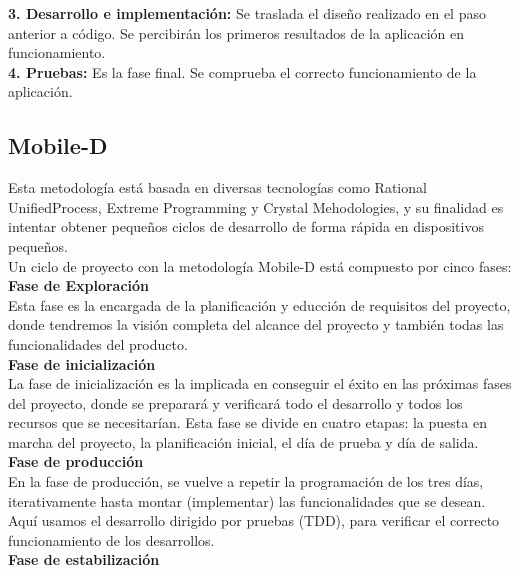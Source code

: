 \textbf{3. Desarrollo e implementación:} Se traslada el diseño realizado en el paso anterior a código. Se percibirán los primeros resultados de la aplicación en funcionamiento.\\

\textbf{4. Pruebas:} Es la fase final. Se comprueba el correcto funcionamiento de la aplicación. \\

\subsection{Mobile-D}

Esta metodología está basada en diversas tecnologías como Rational UnifiedProcess, Extreme Programming y Crystal Mehodologies, y su finalidad es intentar obtener pequeños ciclos de desarrollo de forma rápida en dispositivos pequeños. \\

Un ciclo de proyecto con la metodología Mobile-D está compuesto por cinco fases:\\

\textbf{Fase de Exploración}\\

Esta fase es la encargada de la planificación y educción de requisitos del proyecto, donde tendremos la visión completa del alcance del proyecto y también todas las funcionalidades del producto.  \\

\textbf{Fase de inicialización}\\

La fase de inicialización es la implicada en conseguir el éxito en las próximas fases del proyecto, donde se preparará y verificará todo el desarrollo y todos los recursos que se necesitarían. Esta fase se divide en cuatro etapas: la puesta en marcha del proyecto, la planificación inicial, el día de prueba y día de salida.\\

\textbf{Fase de producción}\\

En la fase de producción, se vuelve a repetir la programación de los tres días, iterativamente hasta montar (implementar) las funcionalidades que se desean. Aquí usamos el desarrollo dirigido por pruebas (TDD), para verificar el correcto funcionamiento de los desarrollos. \\

\newpage 
\textbf{Fase de estabilización} \\

